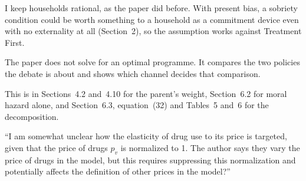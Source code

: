 \documentclass[11pt]{article}
\begin{document}
\begin{response}
I keep households rational, as the paper did before. With present bias, a sobriety
condition could be worth something to a household as a commitment device even with no
externality at all (Section~2), so the assumption works against Treatment First.

\open The paper does not solve for an optimal programme. It compares the two policies
the debate is about and shows which channel decides that comparison.

This is in Sections~4.2 and~4.10 for the parent's weight, Section~6.2 for moral hazard
alone, and Section~6.3, equation~(32) and Tables~5 and~6 for the decomposition.
\end{response}

\begin{referee}
``I am somewhat unclear how the elasticity of drug use to its price is targeted,
given that the price of drugs $p_v$ is normalized to 1. The author says they vary
the price of drugs in the model, but this requires suppressing this normalization
and potentially affects the definition of other prices in the model?''
\end{referee}
\end{document}

